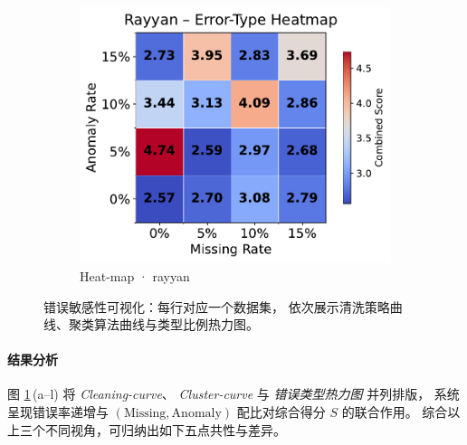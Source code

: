 \documentclass[10pt]{article} %
\numberwithin{equation}{section}
\begin{document}
\begin{figure}[htbp]
\begin{subfigure}{0.295\linewidth}
    \includegraphics[width=\linewidth]{figures/5.3.2graph/rayyan_heatmap.pdf}
    \caption{Heat-map · rayyan}
  \end{subfigure}

  \caption{错误敏感性可视化：每行对应一个数据集，
           依次展示清洗策略曲线、聚类算法曲线与类型比例热力图。}
  \label{fig:error_sense_all}
\end{figure}

\paragraph{结果分析}
\label{sec:error_sense_synthesis}

图 \ref{fig:error_sense_all}\,(a–l) 将 \emph{Cleaning-curve}、%
\emph{Cluster-curve} 与 \emph{错误类型热力图} 并列排版，%
系统呈现错误率递增与 \((\text{Missing},\text{Anomaly})\) 配比对综合得分 \(S\) 的联合作用。
综合以上三个不同视角，可归纳出如下五点共性与差异。
\end{document}
